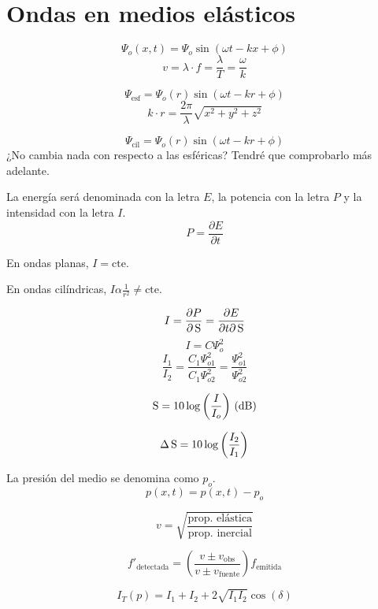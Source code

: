 \documentclass[a4paper]{book}
\begin{document}
\newpage
\section{Ondas en medios elásticos}

\begin{fleqn}
	\begin{multicols}{2}
		\[\Psi _o(x,t)=\Psi _o\sin{\left(\omega t-kx+\phi\right)}\]
		\[v=\lambda\cdot f=\frac{\lambda}{T} =\frac{\omega}{k}\]

		\[\Psi _{\text{esf}}=\Psi _o(r)\sin{\left(\omega t-kr+\phi\right)}\]
		\[k\cdot r=\frac{2\pi}{\lambda}\sqrt{x^2+y^2+z^2}\]

		\[\Psi _{\text{cil}}=\Psi _o(r)\sin{\left(\omega t-kr+\phi\right)}\]
		¿No cambia nada con respecto a las esféricas? Tendré que comprobarlo más adelante.

		\vspace{5pt}

		\noindent La energía será denominada con la letra $E$, la potencia con la letra $P$ y la intensidad con la letra $I$.
		\[P=\frac{\partial E}{\partial t}\]

		\noindent En ondas planas, $I = \text{cte.}$

		\noindent En ondas cilíndricas, $ I\alpha\frac{1}{r^2} \not = \text{cte.}$

		\[I = \pdv{P}{\S} = \pdv{E}{t\partial \S}\]
		\[I = C \Psi_o^2\]
		\[\frac{I_1}{I_2}=\frac{C_1 \Psi _{o1}^2}{C_1 \Psi _{o2}^2}=\frac{\Psi _{o1}^2}{\Psi _{o2}^2}\]

		\[\S = 10 \log{\left( \frac{I}{I_o} \right)} \ (\dB )\]

		\[\Delta \S = 10 \log{\left( \frac{I_2}{I_1} \right) }\]

		\vspace{5pt}

		\noindent La presión del medio se denomina como $p_o$.
		\[p \left( x,t \right) = p(x,t) -p_o \]

		\[v=\sqrt{\frac{\text{prop. elástica}}{\text{prop. inercial}}}\]

		\[f'_{\text{detectada}}=\left( \frac{v\pm v_{\text{obs}}}{v\pm v_{\text{fuente}}} \right)f_{\text{emitida}}\]

		\[I_T(p)=I_1+I_2+2\sqrt{I_1I_2}\cos{\left(\delta \right)}\]


\end{multicols}
\end{fleqn}
\end{document}
